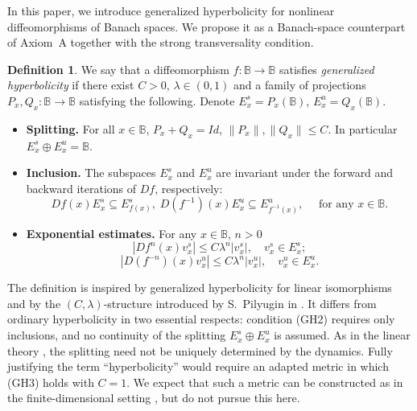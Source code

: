 \documentclass[12pt]{article}
\newcommand{\Bb}{\mathbb{B}}
\theoremstyle{definition}
\newtheorem{defin}[thm]{Definition}
\begin{document}
In this paper, we introduce generalized hyperbolicity for nonlinear diffeomorphisms of Banach spaces. We propose it as a Banach-space counterpart of Axiom~A together with the strong transversality condition.
\begin{defin}\label{def:CLf}
We say that a diffeomorphism $f:\Bb \to \Bb$  satisfies \textit{generalized hyperbolicity} if there exist $C > 0$, $\lambda \in (0, 1)$ and a family of projections $P_x, Q_x: \Bb \to \Bb$ satisfying the following. Denote 
$E^s_x = P_x(\Bb)$, $E^u_x = Q_x(\Bb)$.
\begin{itemize}
    \item[(GH1)] \textbf{Splitting.} For all $x \in \Bb$, $P_x + Q_x = Id$, $\|P_x\|, \|Q_x\| \leq C$. In particular $E^s_x \oplus E^u_x = \Bb$.
    \item[(GH2)] \textbf{Inclusion.} The subspaces $E^s_x$ and $E^u_x$ are invariant under the forward and backward iterations of $Df$, respectively:
    $$
    Df(x)E^s_x \subseteq E^s_{f(x)}, \; D(f^{-1})(x)E^u_x \subseteq E^u_{f^{-1}(x)}, \quad \mbox{ for any $x \in \Bb$}.
    $$
    \item[(GH3)]  \textbf{Exponential estimates.}  For any $x \in \Bb$, $n > 0$
    $$
    |Df^n(x)v^s_x| \leq C \lambda^n |v^s_x|, \quad v^s_x \in E^s_x;
    $$
    $$
    |D(f^{-n})(x)v^u_x| \leq C \lambda^n |v^u_x|, \quad v^u_x \in E^u_x.
    $$
\end{itemize}
\end{defin}
The definition is inspired by generalized hyperbolicity for linear isomorphisms and by the $(C,\lambda)$-structure introduced by S.~Pilyugin in \cite{PilCL}. 
It differs from ordinary hyperbolicity in two essential respects: condition {\rm(GH2)} requires only inclusions, and no continuity of the splitting $E_x^s\oplus E_x^u$ is assumed. 
As in the linear theory \cite{Puj18,Puj21,NilsonAli}, the splitting need not be uniquely determined by the dynamics. 
Fully justifying the term ``hyperbolicity'' would require an adapted metric in which {\rm(GH3)} holds with $C=1$. We expect that such a metric can be constructed as in the finite-dimensional setting \cite{KatokHas,Gourmelon}, but do not pursue this here.

\end{document}

